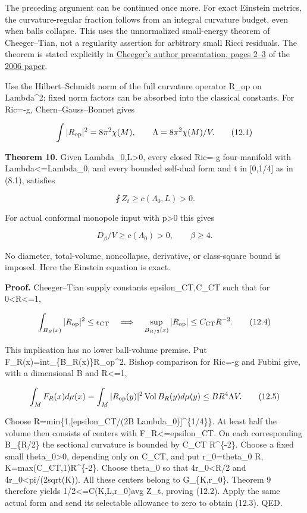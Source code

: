 \documentclass[
  10pt,
]{article}
\begin{document}
The preceding argument can be continued once more. For exact Einstein
metrics, the curvature-regular fraction follows from an integral
curvature budget, even when balls collapse. This uses the unnormalized
small-energy theorem of Cheeger--Tian, not a regularity assertion for
arbitrary small Ricci residuals. The theorem is stated explicitly in
\href{https://sites.duke.edu/scshgap/files/2016/08/dim4dukebeamer.pdf}{Cheeger's
author presentation, pages 2--3} of the
\href{https://doi.org/10.1090/S0894-0347-05-00511-4}{2006 paper}.

Use the Hilbert--Schmidt norm of the full curvature operator R\_op on
Lambda\^{}2; fixed norm factors can be absorbed into the classical
constants. For Ric=-g, Chern--Gauss--Bonnet gives

\[
          \int|R_{\rm op}|^2=8\pi^2\chi(M),\qquad
          \Lambda=8\pi^2\chi(M)/V.                    \tag{12.1}
\]

\textbf{Theorem 10.} Given Lambda\_0,L\textgreater0, every closed Ric=-g
four-manifold with Lambda\textless=Lambda\_0, and every bounded
self-dual form and t in {[}0,1/4{]} as in (8.1), satisfies

\[
                         \fint Z_t\ge c(\Lambda_0,L)>0.
                                                               \tag{12.2}
\]

For actual conformal monopole input with p\textgreater0 this gives

\[
       \boxed{D_\beta/V\ge c(\Lambda_0)>0,
                       \qquad \beta\ge4.}            \tag{12.3}
\]

No diameter, total-volume, noncollapse, derivative, or class-square
bound is imposed. Here the Einstein equation is exact.

\textbf{Proof.} Cheeger--Tian supply constants epsilon\_CT,C\_CT such
that for 0\textless R\textless=1,

\[
 \int_{B_R(x)}|R_{\rm op}|^2\le\epsilon_{\rm CT}
        \quad\Longrightarrow\quad
 \sup_{B_{R/2}(x)}|R_{\rm op}|\le C_{\rm CT}R^{-2}.    \tag{12.4}
\]

This implication has no lower ball-volume premise. Put
F\_R(x)=int\_\{B\_R(x)\}\textbar R\_op\textbar\^{}2. Bishop comparison
for Ric=-g and Fubini give, with a dimensional B and R\textless=1,

\[
 \int_M F_R(x)d\mu(x)
 =\int_M|R_{\rm op}(y)|^2\operatorname{Vol}B_R(y)d\mu(y)
                         \le B R^4\Lambda V.          \tag{12.5}
\]

Choose R=min\{1,{[}epsilon\_CT/(2B Lambda\_0){]}\^{}\{1/4\}\}. At least
half the volume then consists of centers with F\_R\textless=epsilon\_CT.
On each corresponding B\_\{R/2\} the sectional curvature is bounded by
C\_CT R\^{}\{-2\}. Choose a fixed small theta\_0\textgreater0, depending
only on C\_CT, and put r\_0=theta\_0 R, K=max(C\_CT,1)R\^{}\{-2\}.
Choose theta\_0 so that 4r\_0\textless R/2 and
4r\_0\textless pi/(2sqrt(K)). All these centers belong to G\_\{K,r\_0\}.
Theorem 9 therefore yields 1/2\textless=C(K,L,r\_0)avg Z\_t, proving
(12.2). Apply the same actual form and send its selectable allowance to
zero to obtain (12.3). QED.
\end{document}
